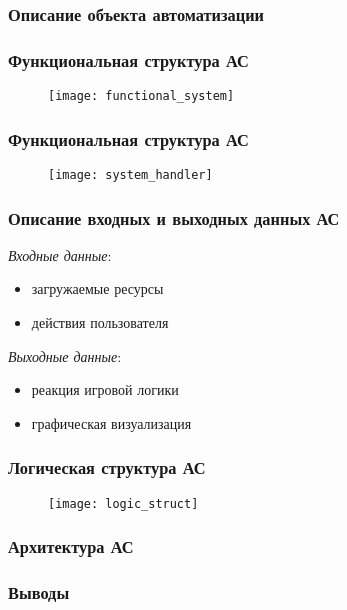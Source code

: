 \begin{frame}
    \frametitle{Описание объекта автоматизации}
\end{frame}

\begin{frame}
    \frametitle{Функциональная структура АС}
    \begin{figure}
        \centering
        \texttt{[image: functional\_system]}
    \end{figure}
\end{frame}

\begin{frame}
    \frametitle{Функциональная структура АС}
    \begin{figure}
        \centering
        \texttt{[image: system\_handler]}
    \end{figure}
\end{frame}

\begin{frame}
    \frametitle{Описание входных и выходных данных АС}

    \emph{Входные данные}:
    \begin{itemize}
        \item загружаемые ресурсы
        \item действия пользователя
    \end{itemize}
    \emph{Выходные данные}:
    \begin{itemize}
        \item реакция игровой логики
        \item графическая визуализация 
    \end{itemize}
\end{frame}

\begin{frame}
    \frametitle{Логическая структура АС}
    \begin{figure}
        \texttt{[image: logic\_struct]}
    \end{figure}
\end{frame}

\begin{frame}
    \frametitle{Архитектура АС}
\end{frame}

\begin{frame}
    \frametitle{Выводы}
\end{frame}